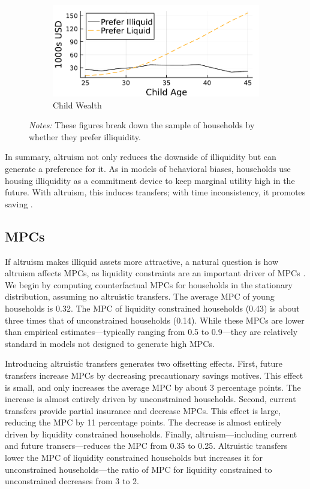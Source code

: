 \documentclass[12pt]{article}
\begin{document}
\begin{figure}[tb]
\begin{subfigure}{0.5\textwidth}
	\end{subfigure}%
	\hfill
	\begin{subfigure}{0.5\textwidth}%
		\caption{Child Wealth}\label{fig:pref_wealthk}%
		\includegraphics[width=\textwidth]{../tabfig/preferliq/prefer_wealthk.pdf}%
	\end{subfigure}%
	\caption*{\footnotesize \textit{Notes:} These figures break down the sample of households by whether they prefer illiquidity.}
\end{figure}

In summary, altruism not only reduces the downside of illiquidity but can generate a preference for it. As in models of behavioral biases, households use housing illiquidity as a commitment device to keep marginal utility high in the future. With altruism, this induces transfers; with time inconsistency, it promotes saving \citep{attanasio2024temptation}. 

\subsection{MPCs}
If altruism makes illiquid assets more attractive, a natural question is how altruism affects MPCs, as liquidity constraints are an important driver of MPCs \citep[see e.g.,][]{aguiar2024hand,Kaplan2014,fagereng2021mpc}. We begin by computing counterfactual MPCs for households in the stationary distribution, assuming no altruistic transfers. The average MPC of young households is 0.32. The MPC of liquidity constrained households (0.43) is about three times that of unconstrained households (0.14). While these MPCs are lower than empirical estimates---typically ranging from 0.5 to 0.9---they are relatively standard in models not designed to generate high MPCs. 

Introducing altruistic transfers generates two offsetting effects. First, future transfers increase MPCs by decreasing precautionary savings motives. This effect is small, and only increases the average MPC by about 3 percentage points. The increase is almost entirely driven by unconstrained households. Second, current transfers provide partial insurance and decrease MPCs. This effect is large, reducing the MPC by 11 percentage points. The decrease is almost entirely driven by liquidity constrained households. Finally, altruism---including current and future transers---reduces the MPC from 0.35 to 0.25. Altruistic transfers lower the MPC of liquidity constrained households but increases it for unconstrained households---the ratio of MPC for liquidity constrained to unconstrained decreases from 3 to 2.
\end{document}
